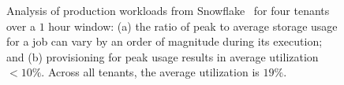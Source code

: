 \begin{figure}[t]
  \centering
  \caption[Snowflake workload anaylsis.]{\small{Analysis of production workloads from Snowflake~\cite{snowset} for four tenants over a $1$ hour window: (a) the ratio of peak to average storage usage for a job can vary by an order of magnitude during its execution; and (b) provisioning for peak usage results in average utilization $<10\%$. Across all tenants, the average utilization is $19\%$.}}\label{fig:ephemerals}%
\end{figure}


